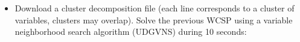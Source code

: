\documentclass[letterpaper,10pt,openany,oneside,english]{sphinxmanual}
\begin{document}
\begin{itemize}
\item {} 
\sphinxAtStartPar
Download a cluster decomposition file  (each line corresponds to a cluster of variables, clusters may overlap). Solve the previous WCSP using a variable neighborhood search algorithm (UDGVNS)  during 10 seconds:

\begin{sphinxVerbatim}[commandchars=\\\{\}]
    
\end{sphinxVerbatim}


\end{itemize}
\end{document}
